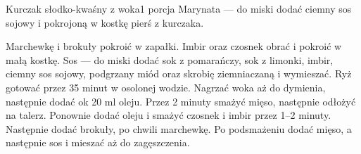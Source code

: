 \documentclass[a4paper,12pt]{article}
\begin{document}
\begin{recipe}{Kurczak słodko-kwaśny z woka}{1 porcja}{}
Marynata --- do miski dodać ciemny sos sojowy i pokrojoną w kostkę pierś z
kurczaka.

Marchewkę i brokuły pokroić w zapałki. Imbir oraz czosnek obrać i pokroić w małą
kostkę. 
Sos --- do miski dodać sok z pomarańczy, sok z limonki, imbir, ciemny sos
sojowy, podgrzany miód oraz skrobię ziemniaczaną i wymieszać.
Ryż gotować przez 35 minut w osolonej wodzie.
\freeform%
Nagrzać woka aż do dymienia, następnie dodać ok 20 ml oleju. Przez 2 minuty
smażyć mięso, następnie odłożyć na talerz. Ponownie dodać oleju i smażyć
czosnek i imbir przez 1--2 minuty. Następnie dodać brokuły, po chwili
marchewkę. Po podsmażeniu dodać mięso, a następnie sos i mieszać aż do
zagęszczenia.

\end{recipe}

\newpage
\end{document}
